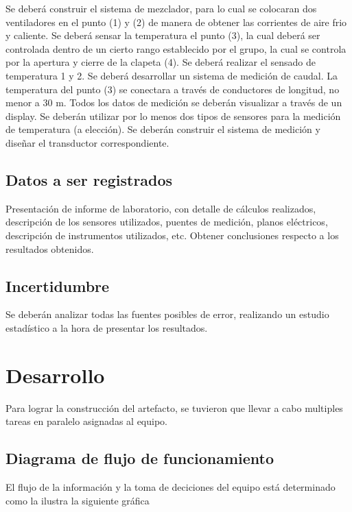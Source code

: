 \documentclass[12pt]{article}
\begin{document}
Se deberá construir el sistema de mezclador, para lo cual se colocaran dos ventiladores en el punto (1) y (2) de manera de obtener las corrientes de aire frio y caliente. Se deberá sensar la temperatura el punto (3), la cual deberá ser controlada dentro de un cierto rango establecido por el grupo, la cual se controla por la apertura y cierre de la clapeta (4).
Se deberá realizar el sensado de temperatura 1 y 2. Se deberá desarrollar un sistema de medición de caudal. 
La temperatura del punto (3) se conectara a través de conductores de longitud, no menor a 30 m. 
Todos los datos de medición se deberán visualizar a través de un display. 
Se deberán utilizar por lo menos dos tipos de sensores para la medición de temperatura (a elección). Se deberán construir el sistema de medición y diseñar el transductor correspondiente.

\subsection{Datos a ser registrados}
Presentación de informe de laboratorio, con detalle de cálculos realizados, descripción de los sensores utilizados, puentes de medición, planos eléctricos, descripción de instrumentos utilizados, etc. 
Obtener conclusiones respecto a los resultados obtenidos.

\subsection{Incertidumbre}
Se deberán analizar todas las fuentes posibles de error, realizando un estudio estadístico a la hora de presentar los resultados.

\section{Desarrollo}
Para lograr la construcción del artefacto, se tuvieron que llevar a cabo multiples tareas en paralelo asignadas al equipo.

\subsection{Diagrama de flujo de funcionamiento}
El flujo de la información y la toma de deciciones del equipo está determinado como la ilustra la siguiente gráfica
\end{document}
